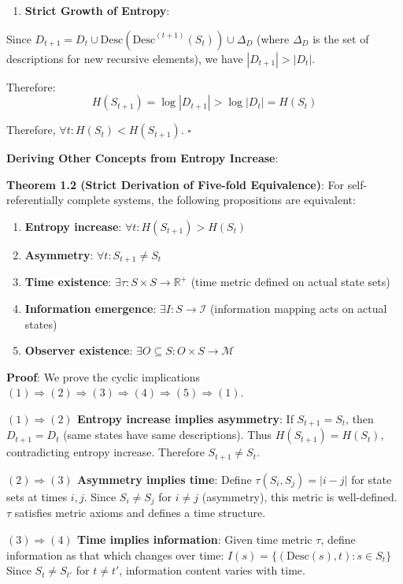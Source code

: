 \begin{enumerate}
\item \textbf{Strict Growth of Entropy}:
\end{enumerate}
  Since $D_{t+1} = D_t \cup {\text{Desc}(\text{Desc}^{(t+1)}(S_t))} \cup \Delta_D$
  (where $\Delta_D$ is the set of descriptions for new recursive elements),
  we have $|D_{t+1}| > |D_t|$.
  
  Therefore:
\begin{equation}
H(S_{t+1}) = \log |D_{t+1}| > \log |D_t| = H(S_t)
\end{equation}

Therefore, $\forall t: H(S_t) < H(S_{t+1})$. $\square$

\textbf{Deriving Other Concepts from Entropy Increase}:

\textbf{Theorem 1.2 (Strict Derivation of Five-fold Equivalence)}:
\label{thm:1.2}
For self-referentially complete systems, the following propositions are equivalent:

\begin{enumerate}
\item \textbf{Entropy increase}: $\forall t: H(S_{t+1}) > H(S_t)$
\item \textbf{Asymmetry}: $\forall t: S_{t+1} \neq S_t$
\item \textbf{Time existence}: $\exists \tau: S \times S \to \mathbb{R}^+$ (time metric defined on actual state sets)
\item \textbf{Information emergence}: $\exists I: S \to \mathcal{I}$ (information mapping acts on actual states)
\item \textbf{Observer existence}: $\exists O \subseteq S: O \times S \to \mathcal{M}$
\end{enumerate}

\textbf{Proof}: We prove the cyclic implications $(1) \Rightarrow (2) \Rightarrow (3) \Rightarrow (4) \Rightarrow (5) \Rightarrow (1)$.

\textbf{$(1) \Rightarrow (2)$ Entropy increase implies asymmetry}:
If $S_{t+1} = S_t$, then $D_{t+1} = D_t$ (same states have same descriptions).
Thus $H(S_{t+1}) = H(S_t)$, contradicting entropy increase.
Therefore $S_{t+1} \neq S_t$.

\textbf{$(2) \Rightarrow (3)$ Asymmetry implies time}:
Define $\tau(S_i, S_j) = |i - j|$ for state sets at times $i, j$.
Since $S_i \neq S_j$ for $i \neq j$ (asymmetry), this metric is well-defined.
$\tau$ satisfies metric axioms and defines a time structure.

\textbf{$(3) \Rightarrow (4)$ Time implies information}:
Given time metric $\tau$, define information as that which changes over time:
$I(s) = \{(\text{Desc}(s), t): s \in S_t\}$
Since $S_t \neq S_{t'}$ for $t \neq t'$, information content varies with time.

